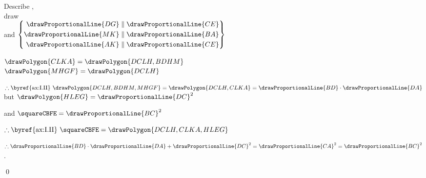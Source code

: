 \documentclass[booklanguage=english]{byrnebook}
\begin{document}
\begin{center}
Describe  ,\\
draw \\
and $\left\{
	\begin{aligned}
		\drawProportionalLine{DG} & \parallel \drawProportionalLine{CE} \\
		\drawProportionalLine{MK} & \parallel \drawProportionalLine{BA} \\
		\drawProportionalLine{AK} & \parallel \drawProportionalLine{CE}\\
	\end{aligned}
\right\}$ 

$\drawPolygon{CLKA} = \drawPolygon{DCLH,BDHM}$ \\
$\drawPolygon{MHGF} = \drawPolygon{DCLH}$ 

$\therefore \mbox{\byref{ax:I.II} } \drawPolygon{DCLH,BDHM,MHGF} = \drawPolygon{DCLH,CLKA} = \drawProportionalLine{BD} \cdot \drawProportionalLine{DA}$
but $\drawPolygon{HLEG} = \drawProportionalLine{DC}^2$ 

and $\squareCBFE = \drawProportionalLine{BC}^2$ \byref{\constref}

$\therefore \mbox{\byref{ax:I.II} } \squareCBFE = \drawPolygon{DCLH,CLKA,HLEG}$

$\therefore \drawProportionalLine{BD} \cdot \drawProportionalLine{DA} + \drawProportionalLine{DC}^2 = \drawProportionalLine{CA}^2 = \drawProportionalLine{BC}^2$.
\end{center}

\qed
\end{document}
